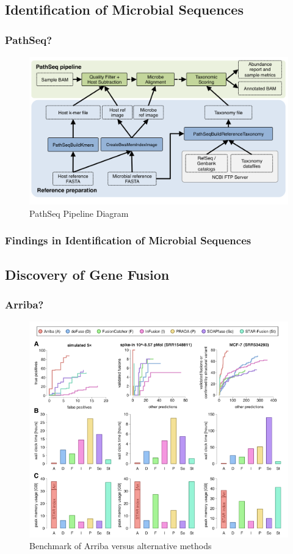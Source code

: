 \documentclass{beamer}
\begin{document}
    \subsection{Identification of Microbial Sequences}
    \begin{frame}
        \frametitle{PathSeq?}

        \begin{figure}
            \includegraphics[width=0.8 \linewidth]{figures/Workflow/PathSeq.png}
            \caption{PathSeq Pipeline Diagram \protect\cite{pathseq1, pathseq2}}
        \end{figure}
    \end{frame}

    \begin{frame}
        \frametitle{Findings in Identification of Microbial Sequences}
    \end{frame}

    \subsection{Discovery of Gene Fusion}
    \begin{frame}
        \frametitle{Arriba?}

        \begin{figure}
            \includegraphics[width=0.6 \linewidth]{figures/Workflow/Arriba.png}
            \caption{Benchmark of Arriba versus alternative methods \protect\cite{Arriba1}}
        \end{figure}
    \end{frame}
\end{document}
